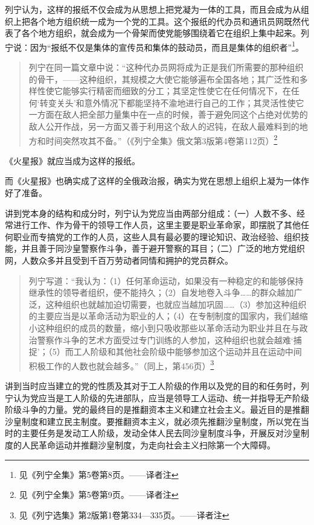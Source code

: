 列宁认为，这样的报纸不仅会成为从思想上把党凝为一体的工具，而且会成为从组织上把各个地方组织统一成为一个党的工具。这个报纸的代办员和通讯员网既然代表了各个地方组织，就会成为一个骨架而使党能够围绕着它在组织上集中起来。列宁说：因为“报纸不仅是集体的宣传员和集体的鼓动员，而且是集体的组织者”\footnote{见《列宁全集》第5卷第8页。——译者注}。

\begin{quotation}
列宁在同一篇文章中说：“这种代办员网将成为正是我们所需要的那种组织的骨干，——这种组织，其规模之大使它能够遍布全国各地；其广泛性和多样性使它能够实行精密而细致的分工；其坚定性使它在任何情况下，在任何‘转变关头’和意外情况下都能坚持不渝地进行自己的工作；其灵活性使它一方面在敌人把全部力量集中在一点的时候，善于避免同这个占绝对优势的敌人公开作战，另一方面又善于利用这个敌人的迟钝，在敌人最难料到的地方和时间突然攻其不备。”（《列宁全集》俄文第3版第4卷第112页）\footnote{见《列宁全集》第5卷第9页。——译者注}
\end{quotation}

《火星报》就应当成为这样的报纸。

而《火星报》也确实成了这样的全俄政治报，确实为党在思想上组织上凝为一体作好了准备。

讲到党本身的结构和成分时，列宁认为党应当由两部分组成：（一）人数不多、经常进行工作、作为骨干的领导工作人员，这里主要是职业革命家，即摆脱了其他任何职业而专搞党的工作的人员，这些人具有最必要的理论知识、政治经验、组织技能，并且善于同沙皇警察作斗争，善于避开警察的耳目；（二）广泛的地方党组织网，人数众多并且受到千百万劳动者同情和拥护的党员群众。

\begin{quotation}
列宁写道：“我认为：（1）任何革命运动，如果没有一种稳定的和能够保持继承性的领导者组织，便不能持久；（2）自发地卷入斗争……的群众越加广泛，这种组织也就越加迫切需要，也就应当越加巩固……（3）参加这种组织的主要应当是以革命活动为职业的人；（4）在专制制度的国家内，我们越缩小这种组织的成员的数量，缩小到只吸收那些以革命活动为职业并且在与政治警察作斗争的艺术方面受过专门训练的人参加，这种组织也就会越难‘捕捉’；（5）而工人阶级和其他社会阶级中能够参加这个运动并且在运动中间积极工作的人数也就会越多。”（同上，第456页）\footnote{见《列宁选集》第2版第1卷第334—335页。——译者注}
\end{quotation}

讲到当时应当建立的党的性质及其对于工人阶级的作用以及党的目的和任务时，列宁认为党应当是工人阶级的先进部队，应当是领导工人运动、统一并指导无产阶级阶级斗争的力量。党的最终目的是推翻资本主义和建立社会主义。最近目的是推翻沙皇制度和建立民主制度。要推翻资本主义，就必须先推翻沙皇制度，所以党在当时的主要任务是发动工人阶级，发动全体人民去同沙皇制度斗争，开展反对沙皇制度的人民革命运动并推翻沙皇制度，为走向社会主义扫除第一个大障碍。

